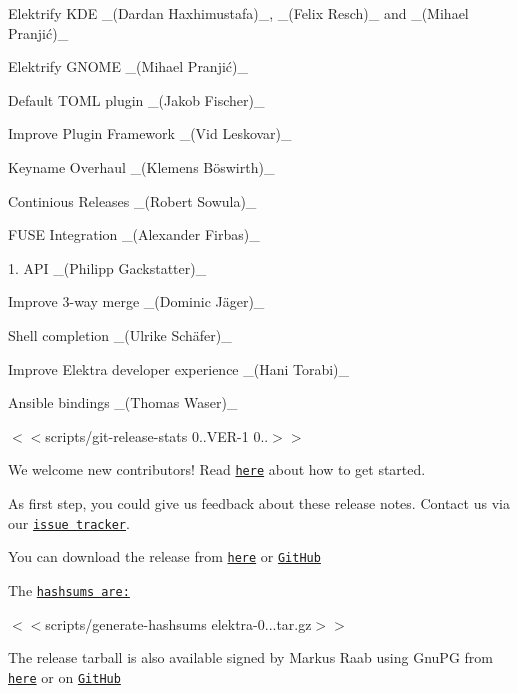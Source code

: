 \begin{DoxyItemize}
\item Elektrify K\+DE \+\_\+(\+Dardan Haxhimustafa)\+\_\+, \+\_\+(\+Felix Resch)\+\_\+ and \+\_\+(Mihael Pranjić)\+\_\+
\item Elektrify G\+N\+O\+ME \+\_\+(Mihael Pranjić)\+\_\+
\item Default T\+O\+ML plugin \+\_\+(\+Jakob Fischer)\+\_\+
\item Improve Plugin Framework \+\_\+(\+Vid Leskovar)\+\_\+
\item Keyname Overhaul \+\_\+(Klemens Böswirth)\+\_\+
\item Continious Releases \+\_\+(\+Robert Sowula)\+\_\+
\item F\+U\+SE Integration \+\_\+(\+Alexander Firbas)\+\_\+
\item 1. A\+PI \+\_\+(\+Philipp Gackstatter)\+\_\+
\item Improve 3-\/way merge \+\_\+(Dominic Jäger)\+\_\+
\item Shell completion \+\_\+(Ulrike Schäfer)\+\_\+
\item Improve Elektra developer experience \+\_\+(\+Hani Torabi)\+\_\+
\item Ansible bindings \+\_\+(\+Thomas Waser)\+\_\+
\end{DoxyItemize}

$<$$<${\ttfamily scripts/git-\/release-\/stats 0..\+V\+ER-\/1 0..}$>$$>$

We welcome new contributors! Read \href{https://www.libelektra.org/devgettingstarted/ideas}{\tt here} about how to get started.

As first step, you could give us feedback about these release notes. Contact us via our \href{https://issues.libelektra.org}{\tt issue tracker}.

You can download the release from \href{https://www.libelektra.org/ftp/elektra/releases/elektra-0.9.3.tar.gz}{\tt here} or \href{https://github.com/ElektraInitiative/ftp/blob/master/releases/elektra-0.9.3.tar.gz?raw=true}{\tt Git\+Hub}

The \href{https://github.com/ElektraInitiative/ftp/blob/master/releases/elektra-0.9.3.tar.gz.hashsum?raw=true}{\tt hashsums are\+:}

$<$$<${\ttfamily scripts/generate-\/hashsums elektra-\/0...\+tar.\+gz}$>$$>$

The release tarball is also available signed by Markus Raab using Gnu\+PG from \href{https://www.libelektra.org/ftp/elektra/releases/elektra-0.9.3.tar.gz.gpg}{\tt here} or on \href{https://github.com/ElektraInitiative/ftp/blob/master/releases/elektra-0.9.3.tar.gz.gpg?raw=true}{\tt Git\+Hub}

